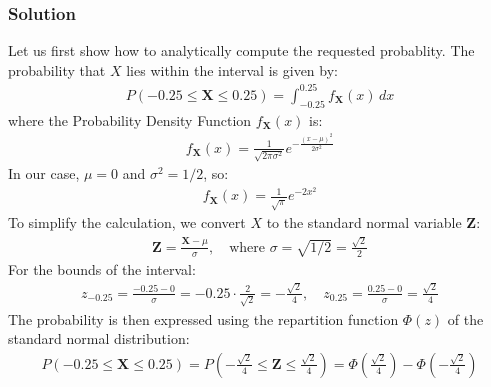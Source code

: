 \documentclass[letterpaper,10pt,english]{jupyterBook}
\begin{document}
\subsubsection{Solution}
\label{\detokenize{01:id2}}
\sphinxAtStartPar
Let us first show how to analytically compute the requested probablity.
The probability that \(X\) lies within the interval is given by:
\begin{equation*}
\begin{split}P(-0.25 \leq \mathbf X \leq 0.25) = \int_{-0.25}^{0.25} f_{\mathbf X}(x) \, dx\end{split}
\end{equation*}
\sphinxAtStartPar
where the Probability Density Function \(f_{\mathbf X}(x)\) is:
\begin{equation*}
\begin{split}f_{\mathbf X}(x) = \frac{1}{\sqrt{2 \pi \sigma^2}} e^{-\frac{(x - \mu)^2}{2 \sigma^2}}\end{split}
\end{equation*}
\sphinxAtStartPar
In our case, \(\mu = 0\) and \(\sigma^2 = 1/2\), so:
\begin{equation*}
\begin{split}f_{\mathbf X}(x) = \frac{1}{\sqrt{\pi}} e^{-2x^2}\end{split}
\end{equation*}
\sphinxAtStartPar
To simplify the calculation, we convert \(X\) to the standard normal variable \(\mathbf Z\):
\begin{equation*}
\begin{split}\mathbf Z = \frac{\mathbf X - \mu}{\sigma}, \quad \text{where } \sigma = \sqrt{1/2} = \frac{\sqrt{2}}{2}\end{split}
\end{equation*}
\sphinxAtStartPar
For the bounds of the interval:
\begin{equation*}
\begin{split}z_{-0.25} = \frac{-0.25 - 0}{\sigma} = -0.25 \cdot \frac{2}{\sqrt{2}} = -\frac{\sqrt{2}}{4}, \quad
z_{0.25} = \frac{0.25 - 0}{\sigma} = \frac{\sqrt{2}}{4}\end{split}
\end{equation*}
\sphinxAtStartPar
The probability is then expressed using the repartition function \(\Phi(z)\) of the standard normal distribution:
\begin{equation*}
\begin{split}P(-0.25 \leq \mathbf X \leq 0.25) = P\left(-\frac{\sqrt{2}}{4} \leq \mathbf Z \leq \frac{\sqrt{2}}{4}\right) = \Phi\left(\frac{\sqrt{2}}{4}\right) - \Phi\left(-\frac{\sqrt{2}}{4}\right)\end{split}
\end{equation*}
\end{document}
